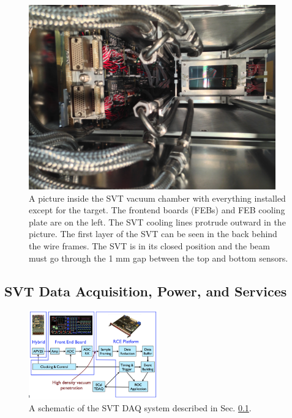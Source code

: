 \begin{figure}
    \centering
    \includegraphics[width=0.95\textwidth]{figs/detector/vacuumbox.png}
    \caption{A picture inside the SVT vacuum chamber with everything installed except for the target. The frontend boards (FEBs) and FEB cooling plate are on the left. The SVT cooling lines protrude outward in the picture. The first layer of the SVT can be seen in the back behind the wire frames. The SVT is in its closed position and the beam must go through the 1 mm gap between the top and bottom sensors.}
    \label{fig:svtvaccum}
\end{figure}


\clearpage

\subsection{SVT Data Acquisition, Power, and Services}\label{sec:svt_daq}

\begin{figure}
    \centering
    \includegraphics[width=0.5\textwidth]{figs/detector/svt-daq-schematic.png}
    \caption{A schematic of the SVT DAQ system described in Sec. \ref{sec:svt_daq}.}
    \label{fig:svtdaq}
\end{figure}

